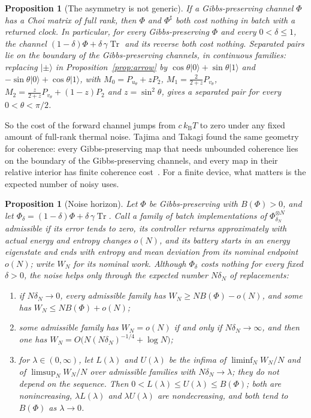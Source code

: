 \documentclass[11pt]{article}
\newtheorem{proposition}[theorem]{Proposition}
\theoremstyle{definition}
\theoremstyle{remark}
\newcommand{\Tr}{\operatorname{Tr}}
\newcommand{\kB}{k_{\mathrm B}}
\begin{document}
\begin{proposition}[The asymmetry is not generic]\label{prop:generic}
If a Gibbs-preserving channel $\Phi$ has a Choi matrix of full rank, then $\Phi$ and $\Phi^\sharp$ both cost nothing in batch with a returned clock. In particular, for every Gibbs-preserving $\Phi$ and every $0<\delta\le1$, the channel $(1-\delta)\Phi+\delta\,\gamma\Tr$ and its reverse both cost nothing. Separated pairs lie on the boundary of the Gibbs-preserving channels, in continuous families: replacing $|\pm\rangle$ in Proposition~\ref{prop:arrow} by $\cos\theta|0\rangle+\sin\theta|1\rangle$ and $-\sin\theta|0\rangle+\cos\theta|1\rangle$, with $M_0=P_{u_\theta}+zP_2$, $M_1=\tfrac2{2+z}P_{v_\theta}$, $M_2=\tfrac{z}{2+z}P_{v_\theta}+(1-z)P_2$ and $z=\sin^2\theta$, gives a separated pair for every $0<\theta<\pi/2$.
\end{proposition}

So the cost of the forward channel jumps from $c\,\kB T$ to zero under any fixed amount of full-rank thermal noise. Tajima and Takagi found the same geometry for coherence: every Gibbs-preserving map that needs unbounded coherence lies on the boundary of the Gibbs-preserving channels, and every map in their relative interior has finite coherence cost~\cite{TajimaTakagi25}. For a finite device, what matters is the expected number of noisy uses.

\begin{proposition}[Noise horizon]\label{prop:noise-horizon}
Let $\Phi$ be Gibbs-preserving with $B(\Phi)>0$, and let $\Phi_\delta=(1-\delta)\Phi+\delta\,\gamma\Tr$. Call a family of batch implementations of $\Phi_{\delta_N}^{\otimes N}$ admissible if its error tends to zero, its controller returns approximately with actual energy and entropy changes $o(N)$, and its battery starts in an energy eigenstate and ends with entropy and mean deviation from its nominal endpoint $o(N)$; write $W_N$ for its nominal work. Although $\Phi_\delta$ costs nothing for every fixed $\delta>0$, the noise helps only through the expected number $N\delta_N$ of replacements:
\begin{enumerate}[label=(\alph*)]
\item if $N\delta_N\to0$, every admissible family has $W_N\ge NB(\Phi)-o(N)$, and some has $W_N\le NB(\Phi)+o(N)$;
\item some admissible family has $W_N=o(N)$ if and only if $N\delta_N\to\infty$, and then one has $W_N=O\bigl(N(N\delta_N)^{-1/4}+\log N\bigr)$;
\item for $\lambda\in(0,\infty)$, let $L(\lambda)$ and $U(\lambda)$ be the infima of $\liminf_NW_N/N$ and of $\limsup_NW_N/N$ over admissible families with $N\delta_N\to\lambda$; they do not depend on the sequence. Then $0<L(\lambda)\le U(\lambda)\le B(\Phi)$; both are nonincreasing, $\lambda L(\lambda)$ and $\lambda U(\lambda)$ are nondecreasing, and both tend to $B(\Phi)$ as $\lambda\to0$.
\end{enumerate}
\end{proposition}
\end{document}

